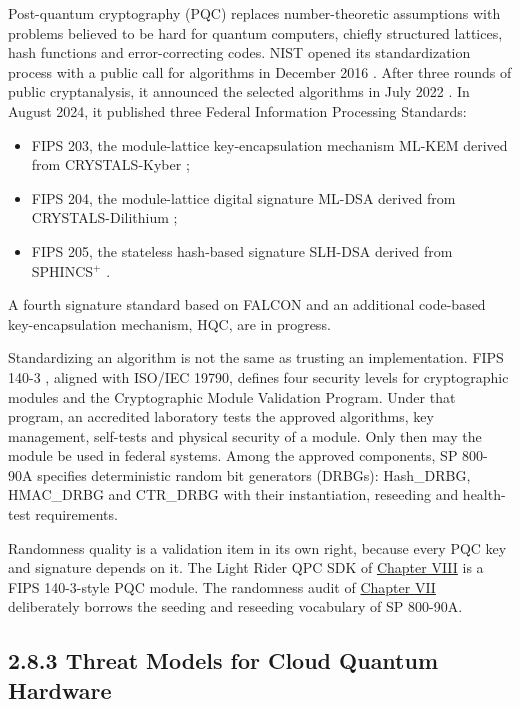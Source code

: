 \documentclass{report}
\theoremstyle{plain}
\theoremstyle{definition}
\theoremstyle{remark}
\begin{document}
Post-quantum cryptography (PQC) \cite{bernstein2017pqc} replaces number-theoretic assumptions with problems believed to be hard for quantum computers, chiefly structured lattices, hash functions and error-correcting codes. NIST opened its standardization process with a public call for algorithms in December 2016 \cite{nist2016pqccall}. After three rounds of public cryptanalysis, it announced the selected algorithms in July 2022 \cite{nist2022ir8413}. In August 2024, it published three Federal Information Processing Standards:
\begin{itemize}
\item FIPS 203, the module-lattice key-encapsulation mechanism ML-KEM derived from CRYSTALS-Kyber \cite{nist2024fips203};
\item FIPS 204, the module-lattice digital signature ML-DSA derived from CRYSTALS-Dilithium \cite{nist2024fips204};
\item FIPS 205, the stateless hash-based signature SLH-DSA derived from SPHINCS$^{+}$ \cite{nist2024fips205}.
\end{itemize}
A fourth signature standard based on FALCON and an additional code-based key-encapsulation mechanism, HQC, are in progress.

Standardizing an algorithm is not the same as trusting an implementation. FIPS 140-3 \cite{nist2019fips1403}, aligned with ISO/IEC 19790, defines four security levels for cryptographic modules and the Cryptographic Module Validation Program. Under that program, an accredited laboratory tests the approved algorithms, key management, self-tests and physical security of a module. Only then may the module be used in federal systems. Among the approved components, SP 800-90A \cite{nist2015sp80090a} specifies deterministic random bit generators (DRBGs): Hash\_DRBG, HMAC\_DRBG and CTR\_DRBG with their instantiation, reseeding and health-test requirements.

Randomness quality is a validation item in its own right, because every PQC key and signature depends on it. The Light Rider QPC SDK of \hyperref[ch:pqc]{Chapter VIII} \cite{guo2026lightriderqpc} is a FIPS 140-3-style PQC module. The randomness audit of \hyperref[ch:qec]{Chapter VII} \cite{guo2026qecaudit} deliberately borrows the seeding and reseeding vocabulary of SP 800-90A.

\subsection{2.8.3 Threat Models for Cloud Quantum Hardware}
\end{document}
